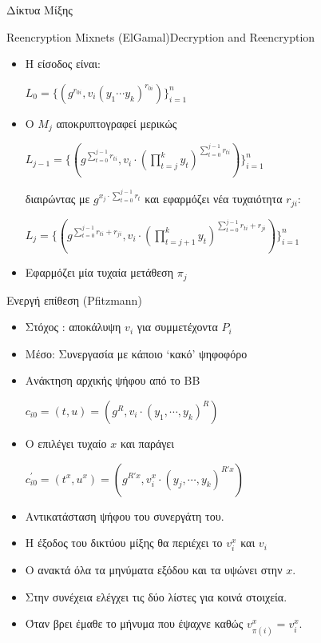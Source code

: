 \documentclass[handout]{beamer}
\begin{document}
\begin{section}{Δίκτυα Μίξης}
\begin{frame}{Reencryption Mixnets (ElGamal)}{Decryption and Reencryption}
\begin{itemize}
        \begin{itemize} 
        \item Η είσοδος είναι:
        \begin{center}$L_0 = \{ (g^{r_{0i}}, v_i (y_1 \cdots y_k)^{r_{0i}}) \}_{i=1}^n$ \end{center} \pause

        \item Ο $M_j$ αποκρυπτογραφεί μερικώς 
        \begin{center}
        $L_{j-1} = \{ (g^{\sum_{t=0}^{j-1} r_{ti}}, v_i \cdot (\prod_{t=j}^k y_t)^{\sum_{t=0}^{j-1} r_{ti}}) \}_{i=1}^n$ 
        \end{center}
        διαιρώντας με $g^{x_j \cdot {\sum_{t=0}^{j-1} r_t}}$ \pause και εφαρμόζει νέα τυχαιότητα $r_{ji}$: 
        \begin{center}
        $L_{j} = \{ (g^{\sum_{t=0}^{j-1} r_{ti} + r_{ji}}, v_i \cdot (\prod_{t=j+1}^k y_t)^{\sum_{t=0}^{j-1} r_{ti} + r_{ji}}) \}_{i=1}^n$
        \end{center} \pause
        \item Εφαρμόζει μία τυχαία μετάθεση $\pi_j$ 
        \end{itemize} 
    \end{itemize} 
\end{frame}

\begin{frame}{Ενεργή επίθεση (Pfitzmann)}
    \begin{itemize}
\item Στόχος \adv: αποκάλυψη $v_i$ για συμμετέχοντα $P_i$ \pause  
\item Μέσο: Συνεργασία με κάποιο `κακό' ψηφοφόρο \pause 
\item Ανάκτηση αρχικής ψήφου από το ΒΒ  \pause 
\begin{center}
$c_{i0} =  (t,u) = (g^R, v_i \cdot (y_1,\cdots,y_k)^R) $ 
\end{center}
\item Ο  \adv επιλέγει τυχαίο $x$ και παράγει \pause 
\begin{center}
$c^{'}_{i0} = (t^x,u^x)=( g^{R'x}, v_{i}^{x} \cdot (y_j,\cdots,y_k)^{R'x} )$ 
\end{center}
\item Αντικατάσταση ψήφου του συνεργάτη του. \pause 
\item Η έξοδος του δικτύου μίξης θα περιέχει  το $v_{i}^{x}$  και $v_{i}$ \pause 
\item Ο \adv ανακτά όλα τα μηνύματα εξόδου και τα υψώνει στην $x$. \pause 
\item Στην συνέχεια ελέγχει τις δύο λίστες για κοινά στοιχεία. \pause 
\item Όταν βρει έμαθε το μήνυμα που έψαχνε καθώς $v_{\pi(i)}^x = v_i^x$. 
\end{itemize}
\end{frame}


\end{section}
\end{document}
